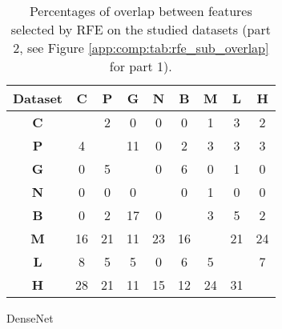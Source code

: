 \begin{table}
  \begin{subtable}[h]{0.45\textwidth}
    \centering
    \begin{tabular}{|c|cccccccc|} 
    \hline
    Dataset & \textbf{C} & \textbf{P} & \textbf{G} & \textbf{N} & \textbf{B} & \textbf{M} & \textbf{L} & \textbf{H}\\
    \hline
    \textbf{C} &   & 2 & 0 & 0 & 0 & 1 & 3 & 2 \\
    \textbf{P} & 4 &   & 11 & 0 & 2 & 3 & 3 & 3 \\
    \textbf{G} & 0 & 5 &   & 0 & 6 & 0 & 1 & 0 \\
    \textbf{N} & 0 & 0 & 0 &   & 0 & 1 & 0 & 0 \\
    \textbf{B} & 0 & 2 & 17 & 0 &   & 3 & 5 & 2 \\
    \textbf{M} & 16 & 21 & 11 & 23 & 16 &   & 21 & 24 \\
    \textbf{L} & 8 & 5 & 5 & 0 & 6 & 5 &   & 7 \\
    \textbf{H} & 28 & 21 & 11 & 15 & 12 & 24 & 31 & \\
    \hline
    \end{tabular}
    \caption{DenseNet}
  \end{subtable}

  \caption{Percentages of overlap between features selected by RFE on the studied datasets (part 2, see Figure \ref{app:comp:tab:rfe_sub_overlap} for part 1).}
  \label{app:comp:tab:rfe_sub_overlap2}
\end{table}


